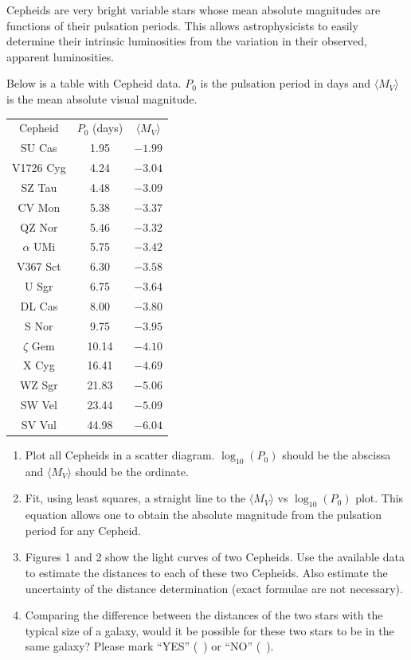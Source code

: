 Cepheids are very bright variable stars whose mean absolute magnitudes are
functions of their pulsation periods. This allows astrophysicists to easily
determine their intrinsic luminosities from the variation in their observed,
apparent luminosities.

Below is a table with Cepheid data. $P_0$ is the pulsation period in days and
$\langle M_V\rangle$ is the mean absolute visual magnitude.

\begin{center}
\begin{tabular}{ccc}
Cepheid & $P_0$ (days) & $\langle M_V\rangle$ \\
SU Cas & 1.95 & $-1.99$ \\
V1726 Cyg & 4.24 & $-3.04$ \\
SZ Tau & 4.48 & $-3.09$ \\
CV Mon & 5.38 & $-3.37$ \\
QZ Nor & 5.46 & $-3.32$ \\
$\alpha$ UMi & 5.75 & $-3.42$ \\
V367 Sct & 6.30 & $-3.58$ \\
U Sgr & 6.75 & $-3.64$ \\
DL Cas & 8.00 & $-3.80$ \\
S Nor & 9.75 & $-3.95$ \\
$\zeta$ Gem & 10.14 & $-4.10$ \\
X Cyg & 16.41 & $-4.69$ \\
WZ Sgr & 21.83 & $-5.06$ \\
SW Vel & 23.44 & $-5.09$ \\
SV Vul & 44.98 & $-6.04$ \\
\end{tabular}
\end{center}

\begin{enumerate}
\item Plot all Cepheids in a scatter diagram. $\log_{10}(P_0)$ should be the
  abscissa and $\langle M_V\rangle$ should be the ordinate.
\item Fit, using least squares, a straight line to the $\langle M_V\rangle$
  vs $\log_{10}(P_0)$ plot. This equation allows one to obtain the absolute
  magnitude from the pulsation period for any Cepheid.
\item Figures 1 and 2 show the light curves of two Cepheids. Use the
  available data to estimate the distances to each of these two Cepheids.
  Also estimate the uncertainty of the distance determination (exact
  formulae are not necessary).
\item Comparing the difference between the distances of the two stars with
  the typical size of a galaxy, would it be possible for these two stars to
  be in the same galaxy? Please mark ``YES'' (~) or ``NO'' (~).
\end{enumerate}

